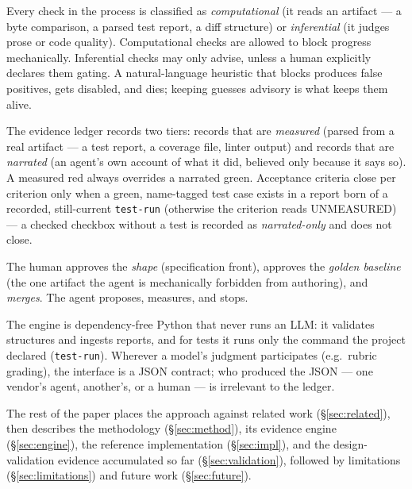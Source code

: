 \documentclass[11pt]{article}
\begin{document}
\begin{description}[leftmargin=1.2em]
\item[Facts block; guesses advise.] Every check in the process is classified as
\emph{computational} (it reads an artifact --- a byte comparison, a parsed test
report, a diff structure) or \emph{inferential} (it judges prose or code
quality). Computational checks are allowed to block progress mechanically.
Inferential checks may only advise, unless a human explicitly declares them
gating. A natural-language heuristic that blocks produces false positives, gets
disabled, and dies; keeping guesses advisory is what keeps them alive.
\item[Measured beats narrated.] The evidence ledger records two tiers: records
that are \emph{measured} (parsed from a real artifact --- a test report, a
coverage file, linter output) and records that are \emph{narrated} (an agent's
own account of what it did, believed only because it says so). A measured red
always overrides a narrated green. Acceptance criteria close per criterion only when a green,
name-tagged test case exists in a report born of a recorded, still-current
\texttt{test-run} (otherwise the criterion reads UNMEASURED) --- a checked checkbox
without a test is recorded as \emph{narrated-only} and does not close.
\item[The human at three fixed points.] The human approves the \emph{shape}
(specification front), approves the \emph{golden baseline} (the one artifact
the agent is mechanically forbidden from authoring), and \emph{merges}. The
agent proposes, measures, and stops.
\item[Tool-agnosticism by contract.] The engine is dependency-free Python that
never runs an LLM: it validates structures and ingests reports, and for tests it
runs only the command the project declared (\texttt{test-run}). Wherever a
model's judgment participates (e.g.\ rubric grading), the interface is a JSON
contract; who produced the JSON --- one vendor's agent, another's, or a human
--- is irrelevant to the ledger.
\end{description}

The rest of the paper places the approach against related work
(\S\ref{sec:related}), then describes the methodology (\S\ref{sec:method}), its
evidence engine (\S\ref{sec:engine}), the reference implementation
(\S\ref{sec:impl}), and the design-validation evidence accumulated so far
(\S\ref{sec:validation}), followed by limitations (\S\ref{sec:limitations}) and
future work (\S\ref{sec:future}).
\end{document}
